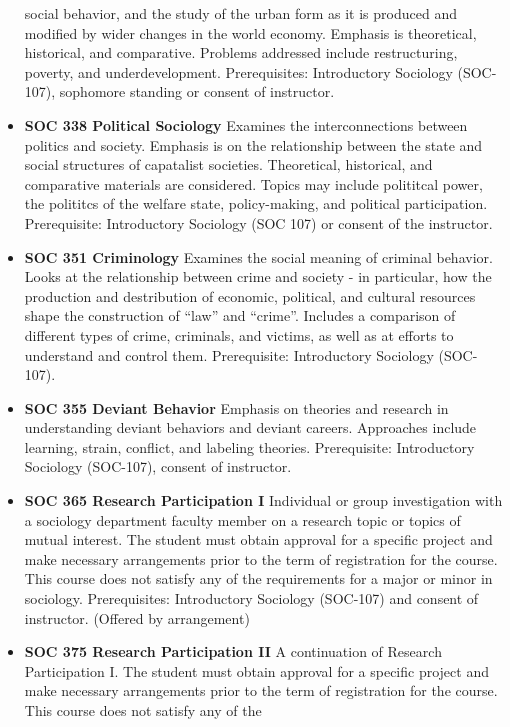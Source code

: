 \documentclass[
  letterpaper,
]{scrbook}
\begin{document}
\begin{itemize}
  social behavior, and the study of the urban form as it is produced and
  modified by wider changes in the world economy. Emphasis is
  theoretical, historical, and comparative. Problems addressed include
  restructuring, poverty, and underdevelopment. Prerequisites:
  Introductory Sociology (SOC-107), sophomore standing or consent of
  instructor.
\item
  \textbf{SOC 338 Political Sociology} Examines the interconnections
  between politics and society. Emphasis is on the relationship between
  the state and social structures of capatalist societies. Theoretical,
  historical, and comparative materials are considered. Topics may
  include polititcal power, the polititcs of the welfare state,
  policy-making, and political participation. Prerequisite: Introductory
  Sociology (SOC 107) or consent of the instructor.\\
\item
  \textbf{SOC 351 Criminology} Examines the social meaning of criminal
  behavior. Looks at the relationship between crime and society - in
  particular, how the production and destribution of economic,
  political, and cultural resources shape the construction of ``law''
  and ``crime''. Includes a comparison of different types of crime,
  criminals, and victims, as well as at efforts to understand and
  control them. Prerequisite: Introductory Sociology (SOC-107).
\item
  \textbf{SOC 355 Deviant Behavior} Emphasis on theories and research in
  understanding deviant behaviors and deviant careers. Approaches
  include learning, strain, conflict, and labeling theories.
  Prerequisite: Introductory Sociology (SOC-107), consent of instructor.
\item
  \textbf{SOC 365 Research Participation I} Individual or group
  investigation with a sociology department faculty member on a research
  topic or topics of mutual interest. The student must obtain approval
  for a specific project and make necessary arrangements prior to the
  term of registration for the course. This course does not satisfy any
  of the requirements for a major or minor in sociology. Prerequisites:
  Introductory Sociology (SOC-107) and consent of instructor. (Offered
  by arrangement)\\
\item
  \textbf{SOC 375 Research Participation II} A continuation of Research
  Participation I. The student must obtain approval for a specific
  project and make necessary arrangements prior to the term of
  registration for the course. This course does not satisfy any of the

\end{itemize}
\end{document}
